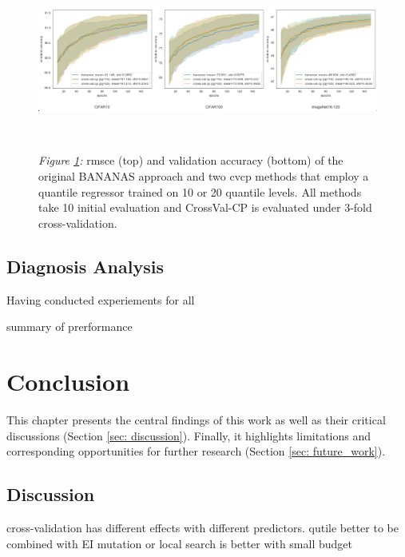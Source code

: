 \documentclass[a4paper,oneside,bibliography=totoc]{scrbook}
\begin{document}
\begin{description}[leftmargin=0cm, listparindent=\parindent]
 	\vspace{0.7em}
		\begin{figure}[H]
			\centering
			\includegraphics[scale=0.295 ]{figs/cvcp_quantile_20.png}
			\label{fig: cvcp_quantile_20}
			\\
 			\parbox{\linewidth}{
 			\vspace{0.5em}
  			{\small \textit{Figure \ref{fig: cvcp_quantile_20}:} \gls{rmsce} (top) and validation accuracy (bottom) of the original BANANAS approach and two \gls{cvcp} methods that employ a quantile regressor trained on 10 or 20 quantile levels. All methods take 10 initial evaluation and CrossVal-CP is evaluated under 3-fold cross-validation.}
 	 	}	
	\end{figure}	 	
 	   	 	
 	\end{description}


\section{Diagnosis Analysis}

Having conducted experiements for all 

summary of prerformance



\chapter{Conclusion}
This chapter presents the central findings of this work as well as their critical discussions (Section \ref{sec: discussion}). Finally, it highlights limitations and corresponding opportunities for further research (Section \ref{sec: future_work}).

\section{Discussion}
cross-validation has different effects with different predictors.
qutile better to be combined with EI
mutation or local search is better with small budget
\label{sec: discussion}
\end{document}
